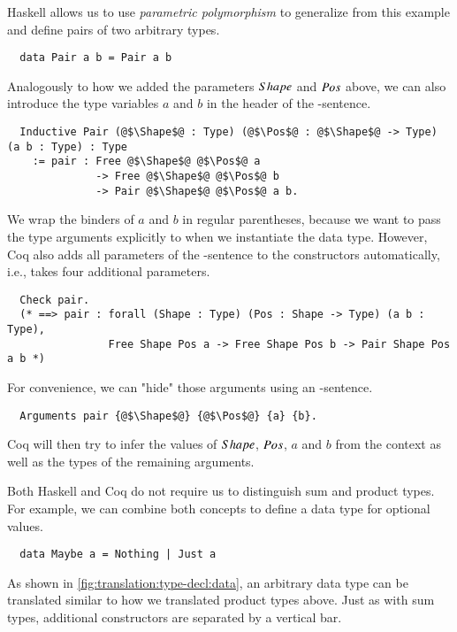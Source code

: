 Haskell allows us to use \textit{parametric polymorphism} to generalize from this example and define pairs of two arbitrary types.
\begin{verbatim}
  data Pair a b = Pair a b
\end{verbatim}
Analogously to how we added the parameters $Shape$ and $Pos$ above, we can also introduce the type variables $a$ and $b$ in the header of the -sentence.
\begin{verbatim}
  Inductive Pair (@$\Shape$@ : Type) (@$\Pos$@ : @$\Shape$@ -> Type) (a b : Type) : Type
    := pair : Free @$\Shape$@ @$\Pos$@ a
              -> Free @$\Shape$@ @$\Pos$@ b
              -> Pair @$\Shape$@ @$\Pos$@ a b.
\end{verbatim}
We wrap the binders of $a$ and $b$ in regular parentheses, because we want to pass the type arguments explicitly to  when we instantiate the data type.
However, Coq also adds all parameters of the -sentence to the constructors automatically, i.e.,  takes four additional parameters.
\begin{verbatim}
  Check pair.
  (* ==> pair : forall (Shape : Type) (Pos : Shape -> Type) (a b : Type),
                Free Shape Pos a -> Free Shape Pos b -> Pair Shape Pos a b *)
\end{verbatim}
For convenience, we can "hide" those arguments using an -sentence.
\begin{verbatim}
  Arguments pair {@$\Shape$@} {@$\Pos$@} {a} {b}.
\end{verbatim}
Coq will then try to infer the values of $Shape$, $Pos$, $a$ and $b$ from the context as well as the types of the remaining arguments.

Both Haskell and Coq do not require us to distinguish sum and product types.
For example, we can combine both concepts to define a data type for optional values.
\begin{verbatim}
  data Maybe a = Nothing | Just a
\end{verbatim}
As shown in \autoref{fig:translation:type-decl:data}, an arbitrary data type can be translated similar to how we translated product types above.
Just as with sum types, additional constructors are separated by a vertical bar.

